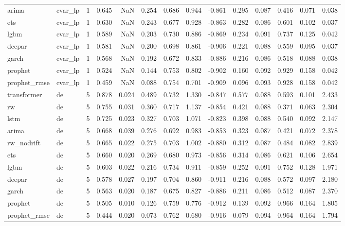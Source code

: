 \begin{table}
\begin{tabular}{llrrrrrrrrrrrr}
arima & cvar\_lp & 1 & 0.645 & NaN & 0.254 & 0.686 & 0.944 & -0.861 & 0.295 & 0.087 & 0.416 & 0.071 & 0.038 \\
ets & cvar\_lp & 1 & 0.630 & NaN & 0.243 & 0.677 & 0.928 & -0.863 & 0.282 & 0.086 & 0.601 & 0.102 & 0.037 \\
lgbm & cvar\_lp & 1 & 0.589 & NaN & 0.203 & 0.730 & 0.886 & -0.869 & 0.234 & 0.091 & 0.737 & 0.125 & 0.042 \\
deepar & cvar\_lp & 1 & 0.581 & NaN & 0.200 & 0.698 & 0.861 & -0.906 & 0.221 & 0.088 & 0.559 & 0.095 & 0.037 \\
garch & cvar\_lp & 1 & 0.568 & NaN & 0.192 & 0.672 & 0.833 & -0.886 & 0.216 & 0.086 & 0.518 & 0.088 & 0.038 \\
prophet & cvar\_lp & 1 & 0.524 & NaN & 0.144 & 0.753 & 0.802 & -0.902 & 0.160 & 0.092 & 0.929 & 0.158 & 0.042 \\
prophet\_rmse & cvar\_lp & 1 & 0.459 & NaN & 0.088 & 0.754 & 0.701 & -0.909 & 0.096 & 0.093 & 0.928 & 0.158 & 0.042 \\
transformer & de & 5 & 0.878 & 0.024 & 0.489 & 0.732 & 1.330 & -0.847 & 0.577 & 0.088 & 0.593 & 0.101 & 2.433 \\
rw & de & 5 & 0.755 & 0.031 & 0.360 & 0.717 & 1.137 & -0.854 & 0.421 & 0.088 & 0.371 & 0.063 & 2.304 \\
lstm & de & 5 & 0.725 & 0.023 & 0.327 & 0.703 & 1.071 & -0.823 & 0.398 & 0.088 & 0.540 & 0.092 & 2.147 \\
arima & de & 5 & 0.668 & 0.039 & 0.276 & 0.692 & 0.983 & -0.853 & 0.323 & 0.087 & 0.421 & 0.072 & 2.378 \\
rw\_nodrift & de & 5 & 0.665 & 0.022 & 0.275 & 0.703 & 1.002 & -0.880 & 0.312 & 0.087 & 0.484 & 0.082 & 2.839 \\
ets & de & 5 & 0.660 & 0.020 & 0.269 & 0.680 & 0.973 & -0.856 & 0.314 & 0.086 & 0.621 & 0.106 & 2.654 \\
lgbm & de & 5 & 0.603 & 0.022 & 0.216 & 0.734 & 0.911 & -0.859 & 0.252 & 0.091 & 0.752 & 0.128 & 1.971 \\
deepar & de & 5 & 0.578 & 0.027 & 0.197 & 0.704 & 0.860 & -0.911 & 0.216 & 0.088 & 0.572 & 0.097 & 2.180 \\
garch & de & 5 & 0.563 & 0.020 & 0.187 & 0.675 & 0.827 & -0.886 & 0.211 & 0.086 & 0.512 & 0.087 & 2.370 \\
prophet & de & 5 & 0.505 & 0.010 & 0.126 & 0.759 & 0.776 & -0.912 & 0.139 & 0.092 & 0.966 & 0.164 & 1.805 \\
prophet\_rmse & de & 5 & 0.444 & 0.020 & 0.073 & 0.762 & 0.680 & -0.916 & 0.079 & 0.094 & 0.964 & 0.164 & 1.794 \\

\end{tabular}
\end{table}
